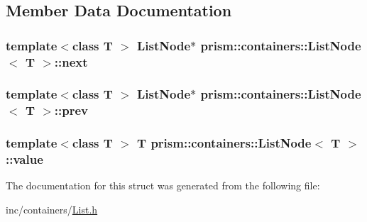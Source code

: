 \subsection{Member Data Documentation}
\subsubsection[{\texorpdfstring{next}{next}}]{\setlength{\rightskip}{0pt plus 5cm}template$<$class T $>$ {\bf List\+Node}$\ast$ {\bf prism\+::containers\+::\+List\+Node}$<$ T $>$\+::next}\hypertarget{structprism_1_1containers_1_1_list_node_ae613dd0cacc977ae45210e3dde6462d7}{}\label{structprism_1_1containers_1_1_list_node_ae613dd0cacc977ae45210e3dde6462d7}
\subsubsection[{\texorpdfstring{prev}{prev}}]{\setlength{\rightskip}{0pt plus 5cm}template$<$class T $>$ {\bf List\+Node}$\ast$ {\bf prism\+::containers\+::\+List\+Node}$<$ T $>$\+::prev}\hypertarget{structprism_1_1containers_1_1_list_node_a0d72aa4b4c00a685aa89ea546ba81c24}{}\label{structprism_1_1containers_1_1_list_node_a0d72aa4b4c00a685aa89ea546ba81c24}
\subsubsection[{\texorpdfstring{value}{value}}]{\setlength{\rightskip}{0pt plus 5cm}template$<$class T $>$ T {\bf prism\+::containers\+::\+List\+Node}$<$ T $>$\+::value}\hypertarget{structprism_1_1containers_1_1_list_node_ad70036170ade67ad68b76f150f6ee0e2}{}\label{structprism_1_1containers_1_1_list_node_ad70036170ade67ad68b76f150f6ee0e2}


The documentation for this struct was generated from the following file\+:\begin{DoxyCompactItemize}
\item 
inc/containers/\hyperlink{_list_8h}{List.\+h}\end{DoxyCompactItemize}
